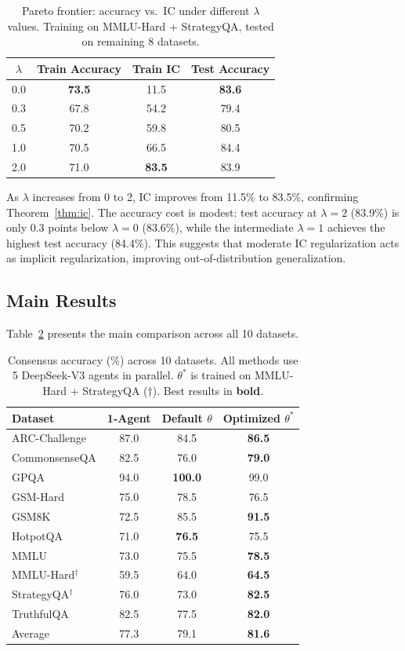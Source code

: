 \documentclass[runningheads]{llncs}
\begin{document}
\begin{table}[t]
\caption{Pareto frontier: accuracy vs.\ IC under different $\lambda$ values. Training on MMLU-Hard + StrategyQA, tested on remaining 8 datasets.}\label{tab:pareto}
\centering
\begin{tabular}{@{}cccc@{}}
\toprule
$\lambda$ & Train Accuracy & Train IC & Test Accuracy \\
\midrule
0.0 & \textbf{73.5} & 11.5 & \textbf{83.6} \\
0.3 & 67.8 & 54.2 & 79.4 \\
0.5 & 70.2 & 59.8 & 80.5 \\
1.0 & 70.5 & 66.5 & 84.4 \\
2.0 & 71.0 & \textbf{83.5} & 83.9 \\
\bottomrule
\end{tabular}
\end{table}

As $\lambda$ increases from 0 to 2, IC improves from 11.5\% to 83.5\%, confirming Theorem~\ref{thm:ic}. The accuracy cost is modest: test accuracy at $\lambda{=}2$ (83.9\%) is only 0.3 points below $\lambda{=}0$ (83.6\%), while the intermediate $\lambda{=}1$ achieves the highest test accuracy (84.4\%). This suggests that moderate IC regularization acts as implicit regularization, improving out-of-distribution generalization.

\subsection{Main Results}

Table~\ref{tab:main} presents the main comparison across all 10 datasets.

\begin{table}[t]
\caption{Consensus accuracy (\%) across 10 datasets. All methods use 5 DeepSeek-V3 agents in parallel. $\theta^*$ is trained on MMLU-Hard + StrategyQA ($\dagger$). Best results in \textbf{bold}.}\label{tab:main}
\centering
\begin{tabular}{@{}lccc@{}}
\toprule
Dataset & 1-Agent & Default $\theta$ & Optimized $\theta^*$ \\
\midrule
ARC-Challenge & 87.0 & 84.5 & \textbf{86.5} \\
CommonsenseQA & 82.5 & 76.0 & \textbf{79.0} \\
GPQA & 94.0 & \textbf{100.0} & 99.0 \\
GSM-Hard & 75.0 & 78.5 & 76.5 \\
GSM8K & 72.5 & 85.5 & \textbf{91.5} \\
HotpotQA & 71.0 & \textbf{76.5} & 75.5 \\
MMLU & 73.0 & 75.5 & \textbf{78.5} \\
MMLU-Hard$^\dagger$ & 59.5 & 64.0 & \textbf{64.5} \\
StrategyQA$^\dagger$ & 76.0 & 73.0 & \textbf{82.5} \\
TruthfulQA & 82.5 & 77.5 & \textbf{82.0} \\
\midrule
Average & 77.3 & 79.1 & \textbf{81.6} \\
\bottomrule
\end{tabular}
\end{table}
\end{document}

